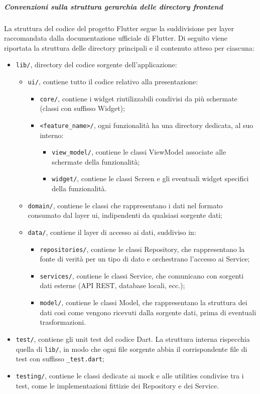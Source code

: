 \documentclass[a4paper,12pt]{article}
\begin{document}
\subparagraph{Convenzioni sulla struttura gerarchia delle directory frontend} \label{subpar:convenzioni-gerarchia-dir-fe}
La struttura del codice del progetto Flutter segue la suddivisione per layer raccomandata dalla documentazione ufficiale di Flutter. 
Di seguito viene riportata la struttura delle directory principali e il contenuto atteso per ciascuna:
\begin{itemize}
    \item \texttt{lib/}, directory del codice sorgente dell'applicazione:
    \begin{itemize}
        \item \texttt{ui/}, contiene tutto il codice relativo alla presentazione:
        \begin{itemize}
            \item \texttt{core/}, contiene i widget riutilizzabili condivisi da più schermate (classi con suffisso Widget);
            \item \texttt{<feature\_name>/}, ogni funzionalità ha una directory dedicata, al suo interno:
            \begin{itemize}
                \item \texttt{view\_model/}, contiene le classi ViewModel associate alle schermate della funzionalità;
                \item \texttt{widget/}, contiene le classi Screen e gli eventuali widget specifici della funzionalità.
            \end{itemize}
        \end{itemize}
        \item \texttt{domain/}, contiene le classi che rappresentano i dati nel formato consumato dal layer ui, indipendenti da qualsiasi sorgente dati;
        \item \texttt{data/}, contiene il layer di accesso ai dati, suddiviso in:
        \begin{itemize}
            \item \texttt{repositories/}, contiene le classi Repository, che rappresentano la fonte di verità per un tipo di dato e orchestrano l'accesso ai Service;
            \item \texttt{services/}, contiene le classi Service, che comunicano con sorgenti dati esterne (API REST, database locali, ecc.);
            \item \texttt{model/}, contiene le classi Model, che rappresentano la struttura dei dati così come vengono ricevuti dalla sorgente dati, prima di eventuali trasformazioni.
        \end{itemize}
    \end{itemize}
    \item \texttt{test/}, contiene gli unit test del codice Dart. La struttura interna rispecchia quella di \texttt{lib/}, in modo che ogni file sorgente abbia il corrispondente file di test con suffisso \texttt{\_test.dart};
    \item \texttt{testing/}, contiene le classi dedicate ai mock e alle utilities condivise tra i test, come le implementazioni fittizie dei Repository e dei Service.
\end{itemize}
\end{document}

